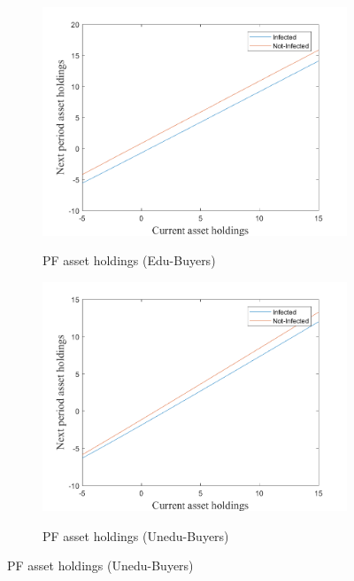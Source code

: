 \begin{figure}[H]\caption{Antiretroviral treatment (ARTs)}
\begin{subfigure}{0.5\textwidth}\caption{PF asset holdings (Edu-Buyers)}
   \includegraphics[width=\linewidth,height = 0.22\textheight]{figures/art/FIG1.png}
    \label{fig_dert}
\end{subfigure}
\hspace*{\fill}
\begin{subfigure}{0.5\textwidth}\caption{PF asset holdings (Unedu-Buyers)}
   \includegraphics[width=\linewidth,height = 0.22\textheight]{figures/art/FIG2.png}
    \label{fig:x_b}
\end{subfigure}

\end{figure}
